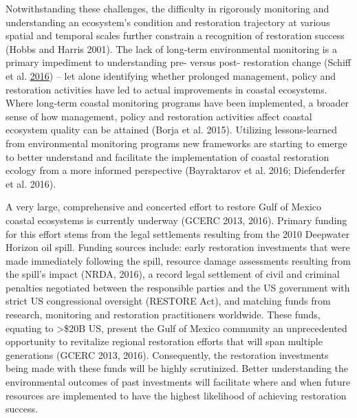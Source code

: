 \documentclass[]{article}
\begin{document}
Notwithstanding these challenges, the difficulty in rigorously
monitoring and understanding an ecosystem's condition and restoration
trajectory at various spatial and temporal scales further constrain a
recognition of restoration success (Hobbs and Harris 2001). The lack of
long-term environmental monitoring is a primary impediment to
understanding pre- versus post- restoration change (Schiff et al.
\protect\hyperlink{ref-Schiff16}{2016}) -- let alone identifying whether
prolonged management, policy and restoration activities have led to
actual improvements in coastal ecosystems. Where long-term coastal
monitoring programs have been implemented, a broader sense of how
management, policy and restoration activities affect coastal ecosystem
quality can be attained (Borja et al. 2015). Utilizing lessons-learned
from environmental monitoring programs new frameworks are starting to
emerge to better understand and facilitate the implementation of coastal
restoration ecology from a more informed perspective (Bayraktarov et al.
2016; Diefenderfer et al. 2016).

A very large, comprehensive and concerted effort to restore Gulf of
Mexico coastal ecosystems is currently underway (GCERC 2013, 2016).
Primary funding for this effort stems from the legal settlements
resulting from the 2010 Deepwater Horizon oil spill. Funding sources
include: early restoration investments that were made immediately
following the spill, resource damage assessments resulting from the
spill's impact (NRDA, 2016), a record legal settlement of civil and
criminal penalties negotiated between the responsible parties and the US
government with strict US congressional oversight (RESTORE Act), and
matching funds from research, monitoring and restoration practitioners
worldwide. These funds, equating to \textgreater{}\$20B US, present the
Gulf of Mexico community an unprecedented opportunity to revitalize
regional restoration efforts that will span multiple generations (GCERC
2013, 2016). Consequently, the restoration investments being made with
these funds will be highly scrutinized. Better understanding the
environmental outcomes of past investments will facilitate where and
when future resources are implemented to have the highest likelihood of
achieving restoration success.
\end{document}
